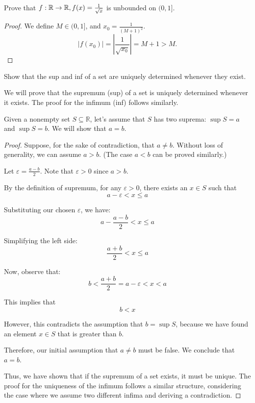 \begin{example}
    Prove that $f: \mathbb{R} \to \mathbb{R}, f(x)=\frac{1}{\sqrt{x}}$ is unbounded on $(0,1]$.
\end{example}
\begin{proof}
We define $M \in (0,1]$, and $x_0 = \frac{1}{(M+1)^2}$. 
$$
\left|f\left(x_0\right)\right|=\left|\frac{1}{\sqrt{x_0}}\right|=M+1>M.
$$
\end{proof}

\begin{exercise}
    Show that the sup and inf of a set are uniquely determined whenever they exist.
\end{exercise}
\begin{solution}
We will prove that the supremum (sup) of a set is uniquely determined whenever it exists. The proof for the infimum (inf) follows similarly.

Given a nonempty set $S \subseteq \mathbb{R}$, let's assume that $S$ has two suprema: $\sup S = a$ and $\sup S = b$. We will show that $a = b$.

\begin{proof}
Suppose, for the sake of contradiction, that $a \neq b$. Without loss of generality, we can assume $a > b$. (The case $a < b$ can be proved similarly.)

Let $\varepsilon = \frac{a-b}{2}$. Note that $\varepsilon > 0$ since $a > b$.

By the definition of supremum, for any $\varepsilon > 0$, there exists an $x \in S$ such that
\[
a - \varepsilon < x \leq a
\]

Substituting our chosen $\varepsilon$, we have:
\[
a - \frac{a-b}{2} < x \leq a
\]

Simplifying the left side:
\[
\frac{a+b}{2} < x \leq a
\]

Now, observe that:
\[
b < \frac{a+b}{2} = a - \varepsilon < x < a
\]

This implies that
\[
b < x
\]

However, this contradicts the assumption that $b = \sup S$, because we have found an element $x \in S$ that is greater than $b$.

Therefore, our initial assumption that $a \neq b$ must be false. We conclude that $a = b$.

Thus, we have shown that if the supremum of a set exists, it must be unique. The proof for the uniqueness of the infimum follows a similar structure, considering the case where we assume two different infima and deriving a contradiction.

\end{proof}
\end{solution}
